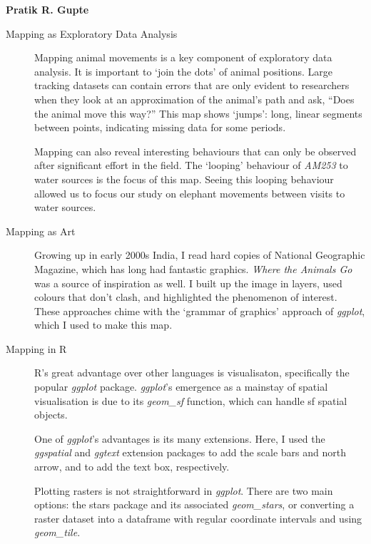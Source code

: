 			{\label{box:mapping}
			\noindent \textbf{Pratik R. Gupte}
			}
		\medskip
		\footnotesize
		\begin{description}
			\item[Mapping as Exploratory Data Analysis] Mapping animal movements is a key component of exploratory data analysis. 
			It is important to `join the dots' of animal positions. Large tracking datasets can contain errors that are only evident to researchers when they look at an approximation of the animal's path and ask, ``Does the animal move this way?''
			This map shows `jumps': long, linear segments between points, indicating missing data for some periods. 
			
			Mapping can also reveal interesting behaviours that can only be observed after significant effort in the field.
			The `looping' behaviour of \emph{AM253} to water sources is the focus of this map. 
			Seeing this looping behaviour allowed us to focus our study on elephant movements between visits to water sources.
			
			\item[Mapping as Art] Growing up in early 2000s India, I read hard copies of National Geographic Magazine, which has long had fantastic graphics. \emph{Where the Animals Go} \citep{footnotecheshire} was a source of inspiration as well. I built up the image in layers, used colours that don't clash, and highlighted the phenomenon of interest. These approaches chime with the `grammar of graphics' approach of \textit{ggplot}, which I used to make this map.
			
   			\item[Mapping in R] R's great advantage over other languages is visualisaton, specifically the popular \emph{ggplot} package. \textit{ggplot}'s emergence as a mainstay of spatial visualisation is due to its \textit{geom\_sf} function, which can handle sf spatial objects.
		
			One of \emph{ggplot}'s advantages is its many extensions. Here, I used the \emph{ggspatial} and \emph{ggtext} extension packages to add the scale bars and north arrow, and to add the text box, respectively.
			   
			Plotting rasters is not straightforward in \emph{ggplot}. There are two main options: the stars package and its associated \textit{geom\_stars}, or converting a raster dataset into a dataframe with regular coordinate intervals and using \textit{geom\_tile}.
			   

\end{description}
